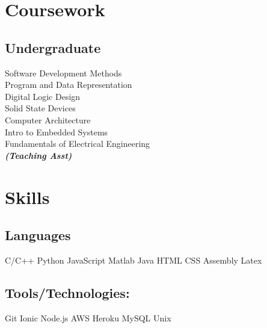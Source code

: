 \documentclass[]{deedy-resume-openfont}
\begin{document}
\begin{minipage}[t]{0.33\textwidth}

\section{Coursework}
\subsection{Undergraduate}
Software Development Methods \\
Program and Data Representation \\
Digital Logic Design \\
Solid State Devices \\
Computer Architecture \\
Intro to Embedded Systems \\
Fundamentals of Electrical Engineering \\
{\footnotesize \textit{\textbf{(Teaching Asst) }}} \\
\sectionsep


\section{Skills}
\subsection{Languages}
C/C++ \textbullet{}  Python  \textbullet{} JavaScript \textbullet{} Matlab   \textbullet{} Java   \textbullet{} HTML   \textbullet{} CSS   \textbullet{} Assembly \textbullet{} Latex \\
\sectionsep
\subsection{Tools/Technologies:}
Git \textbullet{} Ionic \textbullet{} Node.js \textbullet{} AWS \textbullet{} Heroku  \textbullet{} MySQL   \textbullet{} Unix \\
\sectionsep

%
%

\end{minipage} 
\hfill
\end{document}
